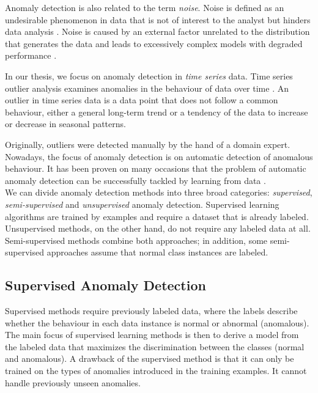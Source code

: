 Anomaly detection is also related to the term \textit{noise}. Noise is defined as an undesirable phenomenon in data that is not of interest to the analyst but hinders data analysis \cite{cvbakv2009}. Noise is caused by an external factor unrelated to the distribution that generates the data \cite{ggh2017} and leads to excessively complex models with degraded performance \cite{wu2007}. 

In our thesis, we focus on anomaly detection in \textit{time series} data. Time series outlier analysis examines anomalies in the behaviour of data over time \cite{gupta2014}. An outlier in time series data is a data point that does not follow a common behaviour, either a general long-term trend or a tendency of the data to increase or decrease in seasonal patterns.

Originally, outliers were detected manually by the hand of a domain expert. 
Nowadays, the focus of anomaly detection is on automatic detection of anomalous behaviour. 
It has been proven on many occasions that the problem of automatic anomaly detection can be successfully tackled by learning from data \cite{he2016} \cite{wang2017timeseriesanomaly}.
\\
We can divide anomaly detection methods into three broad categories: \textit{supervised}, \textit{semi-supervised} and \textit{unsupervised} anomaly detection. Supervised learning algorithms are trained by examples and require a dataset that is already labeled. Unsupervised methods, on the other hand, do not require any labeled data at all. Semi-supervised methods combine both approaches; in addition, some semi-supervised approaches assume that normal class instances are labeled.


\subsection{ Supervised Anomaly Detection }
Supervised methods require previously labeled data, where the labels describe whether the behaviour in each data instance is normal or abnormal (anomalous). The main focus of supervised learning methods is then to derive a model from the labeled data that maximizes the discrimination between the classes (normal and anomalous). A drawback of the supervised method is that it can only be trained on the types of anomalies introduced in the training examples. It cannot handle previously unseen anomalies. 

